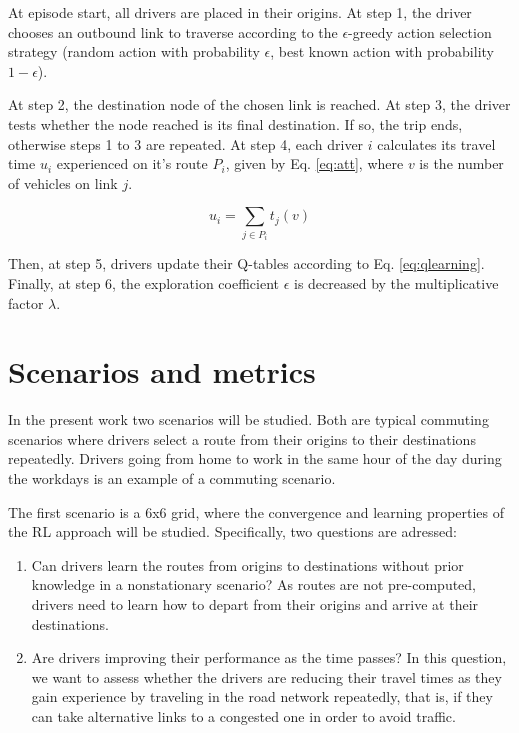 \documentclass{RITA}
\newcommand{\route}[1]{\ensuremath{P_#1}}	%
\newcommand{\travTime}{\ensuremath{t_j}} 	%
\newcommand{\veh}{\ensuremath{v}}		%
\newcommand{\att}[1]{\ensuremath{u_#1}}		%
\begin{document}
At episode start, all drivers are placed in their origins. At step 1, the driver chooses an outbound link to traverse according to the $\epsilon$-greedy action selection strategy (random action with probability $\epsilon$, best known action with probability $1 - \epsilon$). %

At step 2, the destination node of the chosen link is reached. At step 3, the driver tests whether the node reached is its final destination. If so, the trip ends, otherwise steps 1 to 3 are repeated. At step 4, each driver $i$ calculates its travel time $\att{i}$ experienced on it's route $\route{i}$, given by Eq. \eqref{eq:att}, where $\veh$ is the number of vehicles on link $j$.

\begin{equation}
\label{eq:att}
\att{i} = \sum_{j \in \route{i}} \travTime(\veh)
\end{equation}

Then, at step 5, drivers update their Q-tables according to Eq. \eqref{eq:qlearning}. Finally, at step 6, the exploration coefficient $\epsilon$ is decreased by the multiplicative factor $\lambda$.

\section{Scenarios and metrics}
\label{sec:scenario}
In the present work two scenarios will be studied. Both are typical commuting scenarios where drivers select a route from their origins to their destinations repeatedly. Drivers going from home to work in the same hour of the day during the workdays is an example of a commuting scenario.

The first scenario is a 6x6 grid, where the convergence and learning properties of the RL approach will be studied. Specifically, two questions are adressed:

\begin{enumerate}
  \item Can drivers learn the routes from origins to destinations without prior knowledge in a nonstationary scenario? As routes are not pre-computed, drivers need to learn how to depart from their origins and arrive at their destinations.
  \item Are drivers improving their performance as the time passes? In this question, we want to assess whether the drivers are reducing their travel times as they gain experience by traveling in the road network repeatedly, that is, if they can take alternative links to a congested one in order to avoid traffic.
\end{enumerate}
\end{document}
